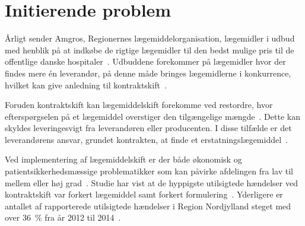 \chapter{Initierende problem}
Årligt sender Amgros, Regionernes lægemiddelorganisation, lægemidler i udbud med henblik på at indkøbe de rigtige lægemidler til den bedst mulige pris til de offentlige danske hospitaler~\citep{Sygehusapoteket2017}. Udbuddene forekommer på lægemidler hvor der findes mere én leverandør, på denne måde bringes lægemidlerne i konkurrence, hvilket kan give anledning til kontraktskift~\citep{Amgros2015}.

Foruden kontraktskift kan lægemiddelskift forekomme ved restordre, hvor efterspørgselen på et lægemiddel overstiger den tilgængelige mængde~\citep{Amgros2015}. Dette kan skyldes leveringesvigt fra leverandøren eller producenten. I disse tilfælde er det leverandørens ansvar, grundet kontrakten, at finde et erstatningslægemiddel~\citep{Laegemiddelinformaion2017, Amgros2017}. 

Ved implementering af lægemiddelskift er der både økonomisk og patientsikkerhedsmæssige problematikker som kan påvirke afdelingen fra lav til mellem eller høj grad~\citep{Laegemiddelinformaion2017, Sygehusapoteket2017a}. Studie har vist at de hyppigste utilsigtede hændelser ved kontraktskift var forkert lægemiddel samt forkert formulering~\citep{Hakonsen2010}. Yderligere er antallet af rapporterede utilsigtede hændelser i Region Nordjylland steget med over 36~\% fra år 2012 til 2014~\citep{Jensen2014}.

